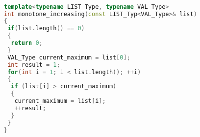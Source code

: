 \vspace{-1em}
\begin{lstlisting}[caption={Polymorphic Operators and Overloading}, 
  language = C++, numbers = none, escapechar = !,label={lst:maxima},
    basicstyle = \ttfamily\bfseries\footnotesize, linewidth = \linewidth]

template<typename LIST_Type, typename VAL_Type>
int monotone_increasing(const LIST_Typ<VAL_Type>& list)
{
 if(list.length() == 0)
 {
  return 0;
 }
 VAL_Type current_maximum = list[0];
 int result = 1;
 for(int i = 1; i < list.length(); ++i)
 {
  if (list[i] > current_maximum)
  {
   current_maximum = list[i];
   ++result;
  }
 }
}
\end{lstlisting}

